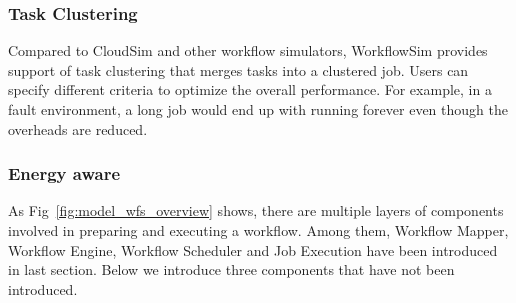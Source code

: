 \subsubsection{Task Clustering} Compared to CloudSim and other workflow simulators, WorkflowSim provides support of task clustering that merges tasks into a clustered job. Users can specify different criteria to optimize the overall performance. For example, in a fault environment, a long job would end up with running forever even though the overheads are reduced. 
\subsubsection{Energy aware}

As Fig~\ref{fig:model_wfs_overview} shows, there are multiple layers of components involved in preparing and executing a workflow. Among them, Workflow Mapper, Workflow Engine, Workflow Scheduler and Job Execution have been introduced in last section. Below we introduce three components that have not been introduced. 
